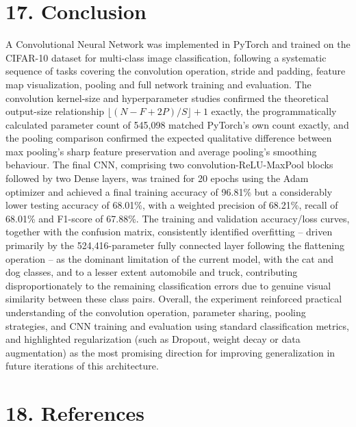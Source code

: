\documentclass[11pt,a4paper]{article}
\begin{document}
\section*{17. Conclusion}

A Convolutional Neural Network was implemented in PyTorch and trained on the CIFAR-10 dataset for multi-class image classification, following a systematic sequence of tasks covering the convolution operation, stride and padding, feature map visualization, pooling and full network training and evaluation. The convolution kernel-size and hyperparameter studies confirmed the theoretical output-size relationship $\lfloor(N-F+2P)/S\rfloor+1$ exactly, the programmatically calculated parameter count of 545{,}098 matched PyTorch's own count exactly, and the pooling comparison confirmed the expected qualitative difference between max pooling's sharp feature preservation and average pooling's smoothing behaviour. The final CNN, comprising two convolution-ReLU-MaxPool blocks followed by two Dense layers, was trained for 20 epochs using the Adam optimizer and achieved a final training accuracy of 96.81\% but a considerably lower testing accuracy of 68.01\%, with a weighted precision of 68.21\%, recall of 68.01\% and F1-score of 67.88\%. The training and validation accuracy/loss curves, together with the confusion matrix, consistently identified overfitting -- driven primarily by the 524{,}416-parameter fully connected layer following the flattening operation -- as the dominant limitation of the current model, with the cat and dog classes, and to a lesser extent automobile and truck, contributing disproportionately to the remaining classification errors due to genuine visual similarity between these class pairs. Overall, the experiment reinforced practical understanding of the convolution operation, parameter sharing, pooling strategies, and CNN training and evaluation using standard classification metrics, and highlighted regularization (such as Dropout, weight decay or data augmentation) as the most promising direction for improving generalization in future iterations of this architecture.

\section*{18. References}
\end{document}
